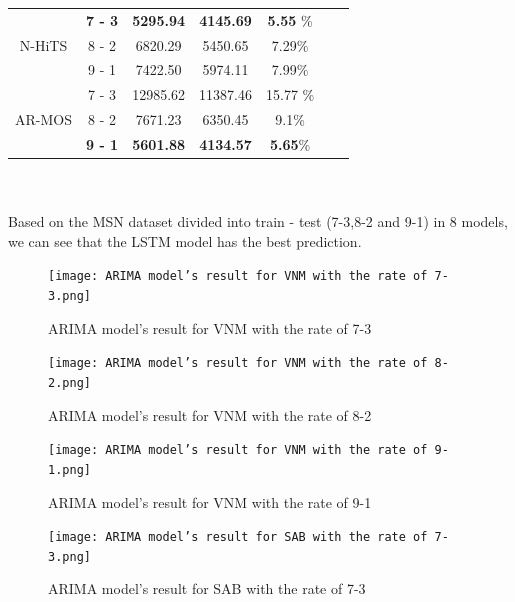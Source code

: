 \documentclass{ieeeojies}
\begin{document}
{\begin{tabular}{|c|c|c|c|c|c|c|}
     \hline
     \multirow{3}{*}{N-HiTS} & \textbf{7 - 3} & \textbf{5295.94} & \textbf{4145.69} & \textbf{5.55} \%\\
      \cline{2-5}
     & 8 - 2 & 6820.29 & 5450.65 & 7.29\% \\
      \cline{2-5}
     & 9 - 1 & 7422.50 & 5974.11 & 7.99\% \\
       \hline
     \multirow{3}{*}{AR-MOS} & 7 - 3 & 12985.62 & 11387.46 & 15.77 \%\\
      \cline{2-5}
     & 8 - 2 & 7671.23 & 6350.45 & 9.1\% \\
      \cline{2-5}
     & \textbf{9 - 1} & \textbf{5601.88} & \textbf{4134.57} & \textbf{5.65}\% \\
     \hline
     \end{tabular}%
     }
     \\
     \\ Based on the MSN dataset divided into train - test (7-3,8-2 and 9-1) in 8 models, we can see that the LSTM model has the best prediction.
    \begin{figure}[H]
    \centering
    \begin{minipage}{0.23\textwidth}
    \centering
    \texttt{[image: ARIMA model’s result for VNM with the rate of 7-3.png]}
    \caption{ARIMA model’s result for VNM with the rate of 7-3}
    \end{minipage}
    \hfill
    \begin{minipage}{0.23\textwidth}
    \centering
    \texttt{[image: ARIMA model’s result for VNM with the rate of 8-2.png]}
    \caption{ARIMA model’s result for VNM with the rate of 8-2}
    \end{minipage}
\end{figure}
\begin{figure}[H]
    \begin{minipage}{0.23\textwidth}
    \centering
    \texttt{[image: ARIMA model’s result for VNM with the rate of 9-1.png]}
    \caption{ARIMA model’s result for VNM with the rate of 9-1}
    \end{minipage}
    \hfill
    \begin{minipage}{0.23\textwidth}
    \centering
    \texttt{[image: ARIMA model’s result for SAB with the rate of 7-3.png]}
    \caption{ARIMA model’s result for SAB with the rate of 7-3}

    \end{minipage}
   \end{figure}
\end{document}
